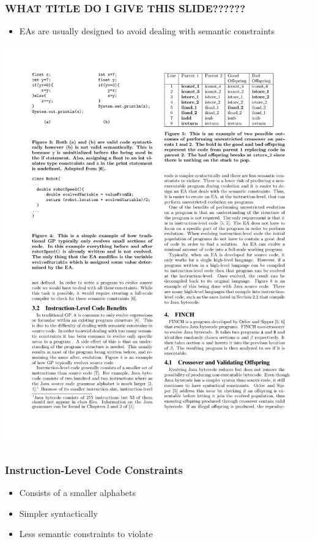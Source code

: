 \documentclass{beamer}
\begin{document}
\begin{frame}
	\frametitle{WHAT TITLE DO I GIVE THIS SLIDE??????}
	\begin{itemize}
		\item EAs are usually designed to avoid dealing with semantic constraints
	\end{itemize}		
\includegraphics[height=.5\textheight]{Illustrations/traditialGP.pdf}
\end{frame}


\begin{frame}
	\frametitle{Instruction-Level Code Constraints}
	\begin{itemize}
		\item Consists of a smaller alphabets
		\item Simpler syntactically
		\item Less semantic constraints to violate
	\end{itemize}		

\end{frame}
\end{document}

